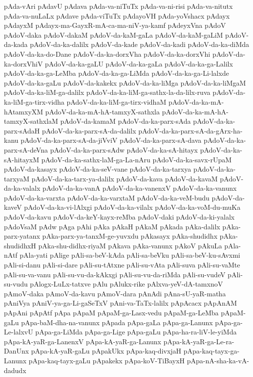 {pAda-vAri
pAdavU
pAdava
pAda-va-niTuTx
pAda-va-ni-risi
pAda-va-nitutx
pAda-va-nuLaLx
pAdave
pAda-viTuTx
pAdayoVH
pAda-yoVshacx
pAdayx
pAdayxM
pAdayx-ma-GayxR-mA-ca-ma-niV-ya-kamf
pAdeyxVna
pAdoV
pAdoV-daka
pAdoV-dakaM
pAdoV-da-kaM-gaLa
pAdoV-da-kaM-gaLiM
pAdoV-da-kada
pAdoV-da-ka-dalilx
pAdoV-da-kade
pAdoV-da-kadi
pAdoV-da-ka-diMda
pAdoV-da-ka-do-Dane
pAdoV-da-ka-dorxVha
pAdoV-da-ka-dorxVhi
pAdoV-da-ka-dorxVhiV
pAdoV-da-ka-gaLU
pAdoV-da-ka-gaLa
pAdoV-da-ka-ga-Lalilx
pAdoV-da-ka-ga-LeMba
pAdoV-da-ka-ga-LiMda
pAdoV-da-ka-ga-Li-lalxde
pAdoV-da-ka-gaLu
pAdoV-da-kakekx
pAdoV-da-ka-liMga
pAdoV-da-ka-liMgaM
pAdoV-da-ka-liM-ga-dalilx
pAdoV-da-ka-liM-ga-sathx-la-da-lilx-ruva
pAdoV-da-ka-liM-ga-tirx-vidha
pAdoV-da-ka-liM-ga-tirx-vidhaM
pAdoV-da-ka-mA-hAtamxyXM
pAdoV-da-ka-mA-hA-tamxyX-sathxla
pAdoV-da-ka-mA-hA-tamxyX-sathxlaM
pAdoV-da-kamaM
pAdoV-da-ka-parx-sAda
pAdoV-da-ka-parx-sAdaH
pAdoV-da-ka-parx-sA-da-dalilx
pAdoV-da-ka-parx-sA-da-gArx-ha-kanu
pAdoV-da-ka-parx-sA-da-jiVviV
pAdoV-da-ka-parx-sA-dava
pAdoV-da-ka-parx-sA-deVna
pAdoV-da-ka-parx-sAdw
pAdoV-da-ka-sA-hitayx
pAdoV-da-ka-sA-hitayxM
pAdoV-da-ka-sathx-laM-ga-La-nAru
pAdoV-da-ka-savx-rUpaM
pAdoV-da-kasayx
pAdoV-da-ka-seV-vane
pAdoV-da-ka-tarxya
pAdoV-da-ka-tarxyaM
pAdoV-da-ka-tarx-ya-dalilx
pAdoV-da-kava
pAdoV-da-kavaM
pAdoV-da-ka-valalx
pAdoV-da-ka-vanA
pAdoV-da-ka-vanenxV
pAdoV-da-ka-vanunx
pAdoV-da-ka-varxta
pAdoV-da-ka-varxtaM
pAdoV-da-ka-veM-budu
pAdoV-da-kaveV
pAdoV-da-ka-vi-lAlxgi
pAdoV-da-ka-vilalx
pAdoV-da-ka-voM-du-muKa
pAdoV-da-kavu
pAdoV-da-keY-kayx-reMba
pAdoV-daki
pAdoV-da-ki-yalalx
pAdoVsaM
pAdw
pAga
pAhi
pAka
pAkaH
pAkaM
pAkada
pAka-dalilx
pAka-parx-yatanx
pAka-parx-ya-tanxM-ge-yuvxdu
pAkasayx
pAka-shudidhx
pAka-shudidhxH
pAka-shu-didhx-riyaM
pAkava
pAka-vanunx
pAkoV
pAkuLa
pAla-nAtf
pAla-yati
pAlige
pAli-sa-beV-kAda
pAli-sa-beVku
pAli-sa-beV-ku-sAvxmi
pAli-si-danu
pAli-si-dare
pAli-su-tAtxne
pAli-su-vAta
pAli-suva
pAli-su-vaMte
pAli-su-va-vanu
pAli-su-vu-da-kAkxgi
pAli-su-vu-da-riMda
pAli-su-vudeV
pAli-su-vudu
pAlogx-LuLx-tatxve
pAlu
pAlukx-rike
pAlxva-yeV-dA-tamxnoV
pAmoV-daka
pAmoV-da-kavu
pAmoV-dara
pAnAdi
pAna-sU-yaR-matha
pAniVya
pAniV-ya-ga-Li-gaSeTxV
pAni-va-TaTx-lalilx
pApAcacx
pApAnAM
pApAni
pApAtf
pApa
pApaM
pApaM-ga-Lasx-vedu
pApaM-ga-LeMba
pApaM-gaLu
pApa-baM-dha-na-vanunx
pApada
pApa-gaLa
pApa-ga-Lanunx
pApa-ga-Le-lalxvU
pApa-ga-LiMda
pApa-ga-Lige
pApa-gaLu
pApa-ha-ra-liV-le-yiMda
pApa-kA-yaR-ga-LanenxV
pApa-kA-yaR-ga-Lanunx
pApa-kA-yaR-ga-Le-ra-DanUnx
pApa-kA-yaR-gaLu
pApakUkx
pApa-kaq-divxjaH
pApa-kaq-tayx-ga-Lanunx
pApa-kaq-tayx-gaLu
pApakekx
pApa-koV-TiBayxH
pApa-nA-sha-ka-vA-dadudx
}
